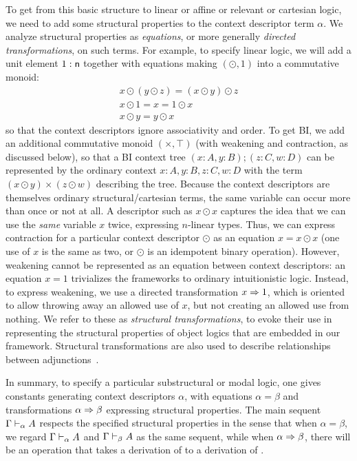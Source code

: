 To get from this basic structure to linear or affine or relevant or
cartesian logic, we need to add some structural properties to the
context descriptor term $\alpha$.  We analyze structural properties as
\emph{equations}, or more generally \emph{directed transformations}, on
such terms.  For example, to specify linear logic, we will add a unit
element $1 : \mathsf{n}$ together with equations making $(\odot,1)$ into a
commutative monoid:
\[
\begin{array}{c}
x \odot (y \odot z) = (x \odot y) \odot z\\
x \odot 1 = x = 1 \odot x\\
x \odot y = y \odot x
\end{array}
\]
so that the context descriptors ignore associativity and order.  To get
BI, we add an additional commutative monoid $(\times,\top)$ (with
weakening and contraction, as discussed below), so that a BI context
tree $(x:A,y:B);(z:C,w:D)$ can be represented by the ordinary context
$x:A,y:B,z:C,w:D$ with the term $(x \odot y) \times (z \odot w)$
describing the tree.  Because the context descriptors are themselves
ordinary structural/cartesian terms, the same variable can occur more
than once or not at all.  A descriptor such as $x \odot x$ captures the
idea that we can use the \emph{same} variable $x$ twice, expressing
$n$-linear types.  Thus, we can express contraction for a particular
context descriptor $\odot$ as an equation $x = x \odot x$ (one use of
$x$ is the same as two, or $\odot$ is an idempotent binary operation).
However, weakening cannot be represented as an equation between context
descriptors: an equation $x = 1$ trivializes the frameworks to ordinary
intuitionistic logic.  Instead, to express weakening, we use a directed
transformation $x \Rightarrow 1$, which is oriented to allow throwing away an
allowed use of $x$, but not creating an allowed use from nothing.  We
refer to these as \emph{structural transformations}, to evoke their use
in representing the structural properties of object logics that are
embedded in our framework.  Structural transformations are also used to
describe relationships between adjunctions~\citep{ls16adjoint}.

In summary, to specify a particular substructural or modal logic, one
gives constants generating context descriptors $\alpha$, with equations
$\alpha = \beta$ and transformations $\alpha \Rightarrow \beta$ expressing
structural properties.  The main sequent $\Gamma \vdash_{\alpha} A$
respects the specified structural properties in the sense that when
$\alpha = \beta$, we regard $\Gamma \vdash_{\alpha} A$ and
$\Gamma \vdash_{\beta} A$ as the same sequent, while when $\alpha \Rightarrow
\beta$, there will be an operation that takes a derivation of
 to a derivation of .

